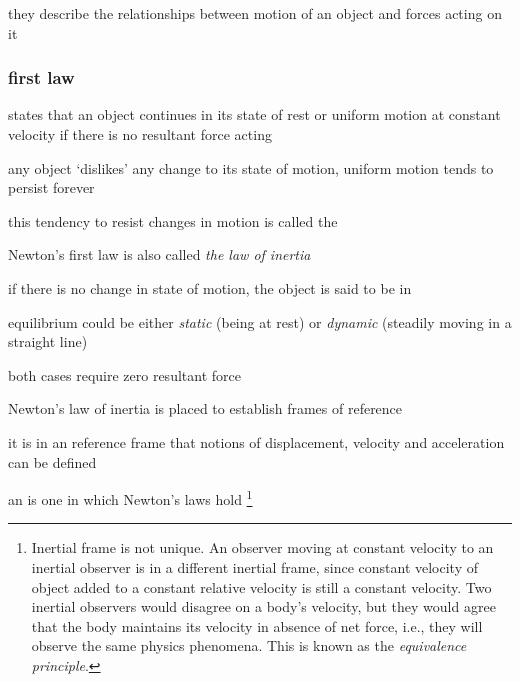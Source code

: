 they describe the relationships between motion of an object and forces acting on it


\subsubsection{first law}

\begin{ilight}
	 states that an object continues in its state of rest or uniform motion at constant velocity if there is no resultant force acting
\end{ilight}


\cmt any object `dislikes' any change to its state of motion, uniform motion tends to persist forever

this tendency to resist changes in motion is called the 

Newton's first law is also called \emph{the law of inertia}

\cmt if there is no change in state of motion, the object is said to be in 

equilibrium could be either \emph{static} (being at rest) or \emph{dynamic} (steadily moving in a straight line)

both cases require zero resultant force

\cmt Newton’s law of inertia is placed to establish frames of reference

it is in an reference frame that notions of displacement, velocity and acceleration can be defined

an  is one in which Newton’s laws hold
\footnote{Inertial frame is not unique. An observer moving at constant velocity to an inertial observer is in a different inertial frame, since constant velocity of object added to a constant relative velocity is still a constant velocity. Two inertial observers would disagree on a body's velocity, but they would agree that the body maintains its velocity in absence of net force, i.e., they will observe the same physics phenomena. This is known as the \emph{equivalence principle}.}

%	



